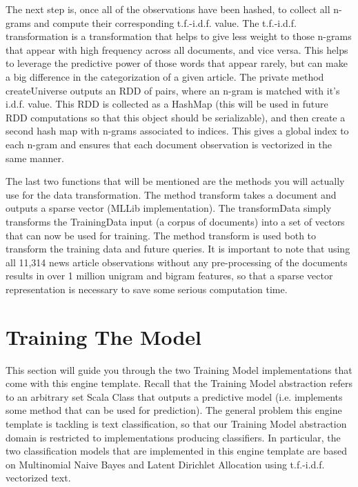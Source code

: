 \documentclass[a4paper,12pt]{article}
\newcommand{\3}{\left}
\newcommand{\4}{\right}
\renewcommand{\-}[1]{{}^{-#1}}
\begin{document}
The next step is, once all of the observations have been hashed, to collect all n-grams and compute their corresponding t.f.-i.d.f. 
value. The t.f.-i.d.f. transformation is a transformation that helps to give less weight to those n-grams that appear with high frequency across all documents, and vice versa. This helps to leverage the predictive power of those words that appear rarely, but can make a big difference in the categorization of a given article. The private method createUniverse outputs an RDD of pairs, where an n-gram is matched with it's i.d.f. value. This RDD is collected as a HashMap (this will be used in future RDD computations so that this object should be serializable), and then create a second hash map with n-grams associated to indices. This gives a global index to each n-gram and ensures that each document observation is vectorized in the same manner. 

The last two functions that will be mentioned are the methods you will actually use for the data transformation. The method transform takes a document and outputs a sparse vector (MLLib implementation). The transformData simply transforms the TrainingData input (a corpus of documents) into a set of vectors that can now be used for training. The method transform is used both to transform the training data and future queries. It is important to note that using all 11,314 news article observations without any pre-processing of the documents results in over 1 million unigram and bigram features, so that a sparse vector representation is necessary to save some serious computation time.

\section*{Training The Model}

This section will guide you through the two Training Model implementations that come with this engine template. Recall that the Training Model abstraction refers to an arbitrary set Scala Class that outputs a predictive model (i.e. implements some method that can be used for prediction). The general problem this engine template is tackling is text classification, so that our Training Model abstraction domain is restricted to implementations producing classifiers. In particular, the two classification models that are implemented in this engine template are based on Multinomial Naive Bayes and Latent Dirichlet Allocation using t.f.-i.d.f. vectorized text. 
\end{document}
